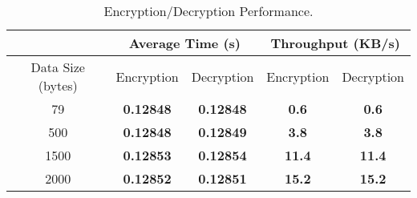 \begin{table}[h!]
	\centering
	\def\arraystretch{1.5}
	\begin{tabular}{|c|c|c|c|c|} \cline{2-5}
		\multicolumn{1}{c|}{} & \multicolumn{2}{c|}{Average Time (s)}  & \multicolumn{2}{c|}{Throughput (KB/s)}\\ \hline
		\centering Data Size (bytes) & Encryption & Decryption & Encryption & Decryption \\ \hline
		79 & \textbf{0.12848} & \textbf{0.12848} & \textbf{0.6} & \textbf{0.6}	      \\ \hline
		500 & \textbf{0.12848} & \textbf{0.12849} & \textbf{3.8} & \textbf{3.8}	      \\ \hline
		1500 & \textbf{0.12853} & \textbf{0.12854} & \textbf{11.4} & \textbf{11.4}	      \\ \hline
		2000 & \textbf{0.12852} & \textbf{0.12851} & \textbf{15.2} & \textbf{15.2}            \\ \hline
	\end{tabular}
	\caption{Encryption/Decryption Performance.}
	\label{tab:data-performance}
\end{table}
